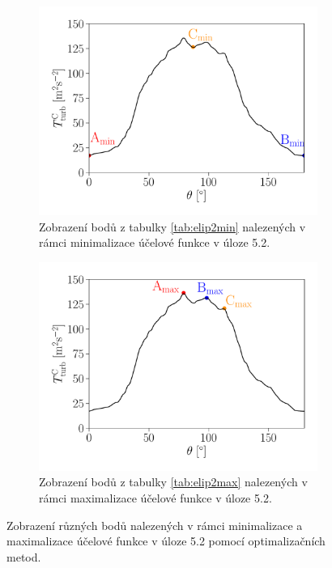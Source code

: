 \begin{figure}[H]
	\vspace{2mm}
	\begin{subfigure}[b]{0.45\textwidth}		
		\centering
		\hspace{-15mm}
		\includegraphics[width=1.19\textwidth]{Images/elip2minpoints.pdf}
		\caption{Zobrazení bodů z tabulky \ref{tab:elip2min} nalezených v rámci minimalizace účelové funkce v úloze 5.2.}
		\label{fig:elip2minbody}
	\end{subfigure}
	\begin{subfigure}[b]{0.12\textwidth}		
		\centering
		\hspace{-19mm}
	\end{subfigure}
	\begin{subfigure}[b]{0.45\textwidth}
		\centering
		\hspace{-15mm}
		\includegraphics[width=1.19\textwidth]{Images/elip2maxpoints.pdf}
		\caption{Zobrazení bodů z tabulky \ref{tab:elip2max} nalezených v rámci maximalizace účelové funkce v úloze 5.2.}
		\label{fig:elip2maxbody}
	\end{subfigure}	
	\caption{Zobrazení různých bodů nalezených v rámci minimalizace a maximalizace účelové funkce v úloze 5.2 pomocí optimalizačních metod.}
	\label{fig:minmax elip2}
\end{figure}



